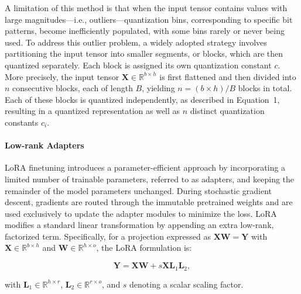 A limitation of this method is that when the input tensor contains values with large magnitudes—i.e., outliers—quantization bins, corresponding to specific bit patterns, become inefficiently populated, with some bins rarely or never being used. To address this outlier problem, a widely adopted strategy involves partitioning the input tensor into smaller segments, or blocks, which are then quantized separately. Each block is assigned its own quantization constant $c$. More precisely, the input tensor $\mathbf{X}\in \mathbb{R}^{b\times h}$ is first flattened and then divided into $n$ consecutive blocks, each of length $B$, yielding ${n = ({b\times h} )/{B} }$ blocks in total. Each of these blocks is quantized independently, as described in Equation~1, resulting in a quantized representation as well as $n$ distinct quantization constants $c_i$.

\paragraph{Low-rank Adapters} LoRA finetuning \citep{hu2021lora} introduces a parameter-efficient approach by incorporating a limited number of trainable parameters, referred to as adapters, and keeping the remainder of the model parameters unchanged. During stochastic gradient descent, gradients are routed through the immutable pretrained weights and are used exclusively to update the adapter modules to minimize the loss. LoRA modifies a standard linear transformation by appending an extra low-rank, factorized term. Specifically, for a projection expressed as ${\mathbf{X} \mathbf{W} = \mathbf{Y}}$ with $\mathbf{X}\in  \mathbb{R}^{b\times h}$ and $\mathbf{W}\in  \mathbb{R}^{h\times o}$, the LoRA formulation is:

\begin{equation}
    \mathbf{Y} = \mathbf{X}\mathbf{W} + s\mathbf{X}\mathbf{L}_1\mathbf{L}_2,
\end{equation}

with $\mathbf{L}_1\in  \mathbb{R}^{h\times r}$, $\mathbf{L}_2\in  \mathbb{R}^{r\times o}$, and $s$ denoting a scalar scaling factor.

